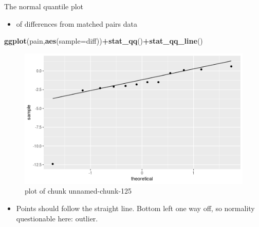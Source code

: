 \documentclass[ignorenonframetext,]{beamer}
\newenvironment{Shaded}{\begin{snugshade}}{\end{snugshade}}
\newcommand{\DataTypeTok}[1]{\textcolor[rgb]{0.13,0.29,0.53}{#1}}
\newcommand{\KeywordTok}[1]{\textcolor[rgb]{0.13,0.29,0.53}{\textbf{#1}}}
\newcommand{\NormalTok}[1]{#1}
\newcommand{\OperatorTok}[1]{\textcolor[rgb]{0.81,0.36,0.00}{\textbf{#1}}}
\providecommand{\tightlist}{%
  \setlength{\itemsep}{0pt}\setlength{\parskip}{0pt}}
\begin{document}
\begin{frame}[fragile]{The normal quantile plot}
\protect\hypertarget{the-normal-quantile-plot}{}

\begin{itemize}
\tightlist
\item
  of differences from matched pairs data
\end{itemize}

\begin{Shaded}
\begin{Highlighting}[]
\KeywordTok{ggplot}\NormalTok{(pain,}\KeywordTok{aes}\NormalTok{(}\DataTypeTok{sample=}\NormalTok{diff))}\OperatorTok{+}\KeywordTok{stat_qq}\NormalTok{()}\OperatorTok{+}\KeywordTok{stat_qq_line}\NormalTok{()}
\end{Highlighting}
\end{Shaded}

\begin{figure}
\centering
\includegraphics{figure/unnamed-chunk-125-1.png}
\caption{plot of chunk unnamed-chunk-125}
\end{figure}

\begin{itemize}
\tightlist
\item
  Points should follow the straight line. Bottom left one way off, so
  normality questionable here: outlier.
\end{itemize}

\end{frame}
\end{document}
